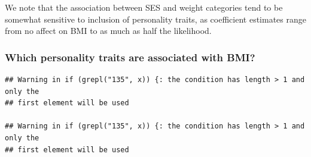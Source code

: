 \documentclass[man]{apa6}
\begin{document}
We note that the association between SES and weight categories tend to be somewhat sensitive to inclusion of personality traits, as coefficient estimates range from no affect on BMI to as much as half the likelihood.

\hypertarget{which-personality-traits-are-associated-with-bmi}{%
\subsubsection{Which personality traits are associated with BMI?}\label{which-personality-traits-are-associated-with-bmi}}

\begin{verbatim}
## Warning in if (grepl("135", x)) {: the condition has length > 1 and only the
## first element will be used

## Warning in if (grepl("135", x)) {: the condition has length > 1 and only the
## first element will be used
\end{verbatim}
\end{document}
